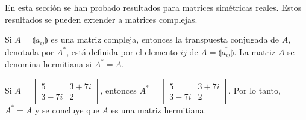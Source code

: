 En esta sección se han probado resultados para matrices simétricas reales. Estos resultados se pueden extender a matrices complejas.

\begin{definition}
    Si $A = \llparenthesis a_{ij} \rrparenthesis$ es una matriz compleja, entonces la transpuesta conjugada de $A$, denotada por $A^*$, está definida por el elemento $ij$ de $A = \overline{\llparenthesis a_{ij} \rrparenthesis}$. La matriz $A$ se denomina hermitiana si $A^* = A$.
\end{definition}

\begin{example}
    Si $A = \begin{bmatrix}
        5 & 3 + 7i \\
        3 - 7i & 2
    \end{bmatrix}$, entonces $A^* = \begin{bmatrix}
        5 & 3 + 7i \\
        3 - 7i & 2
    \end{bmatrix}$. Por lo tanto, $A^* = A$ y se concluye que $A$ es una matriz hermitiana.
\end{example}

